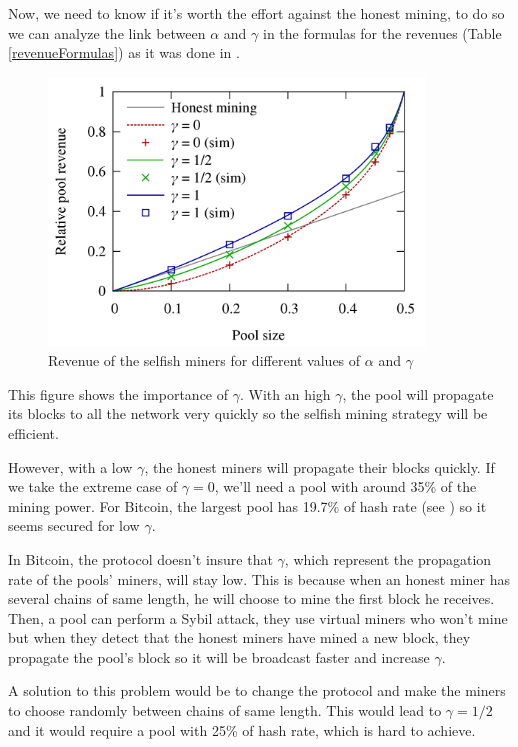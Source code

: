 Now, we need to know if it's worth the effort against the honest mining, to do so we can analyze the link between $\alpha$ and $\gamma$ in the formulas for the revenues (Table \ref{revenueFormulas}) as it was done in \cite{majority_not_enough}. \newline

\begin{figure}[h]
\centering
\includegraphics[width=10cm]{Figures/poolRevenue}
\caption{Revenue of the selfish miners for different values of $\alpha$ and $\gamma$}
\end{figure}
\medskip

This figure shows the importance of $\gamma$. With an high $\gamma$, the pool will propagate its blocks to all the network very quickly so the selfish mining strategy will be efficient.

However, with a low $\gamma$, the honest miners will propagate their blocks quickly. If we take the extreme case of $\gamma = 0$, we'll need a pool with around 35\% of the mining power. For Bitcoin, the largest pool has 19.7\% of hash rate (see \cite{hashrate_pools}) so it seems secured for low $\gamma$.\newline

In Bitcoin, the protocol doesn't insure that $\gamma$, which represent the propagation rate of the pools' miners, will stay low. This is because when an honest miner has several chains of same length, he will choose to mine the first block he receives. Then, a pool can perform a Sybil attack, they use virtual miners who won't mine but when they detect that the honest miners have mined a new block, they propagate the pool's block so it will be broadcast faster and increase $\gamma$. \newline

A solution to this problem would be to change the protocol and make the miners to choose randomly between chains of same length. This would lead to $\gamma = 1/2$ and it would require a pool with 25\% of hash rate, which is hard to achieve.

